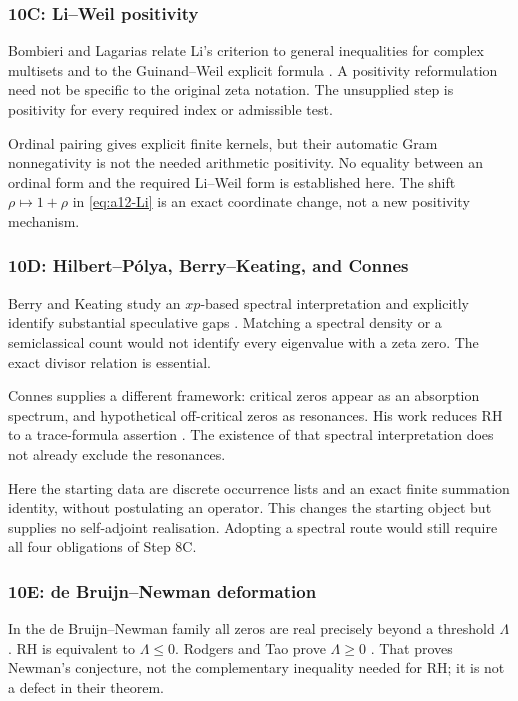 \documentclass[11pt]{amsart}
\numberwithin{equation}{section}
\theoremstyle{plain}
\theoremstyle{definition}
\theoremstyle{remark}
\begin{document}
\subsubsection{10C: Li--Weil positivity}
\label{subsubsec:a12-lit-Li}
Bombieri and Lagarias relate Li's criterion to general inequalities for
complex multisets and to the Guinand--Weil explicit formula
\cite{BombieriLagarias1999}. A positivity reformulation need not be
specific to the original zeta notation. The unsupplied step is positivity
for every required index or admissible test.

Ordinal pairing gives explicit finite kernels, but their automatic Gram
nonnegativity is not the needed arithmetic positivity. No equality between
an ordinal form and the required Li--Weil form is established here.
The shift $\rho\mapsto1+\rho$ in \eqref{eq:a12-Li} is an exact coordinate
change, not a new positivity mechanism.

\subsubsection{10D: Hilbert--P\'olya, Berry--Keating, and Connes}
\label{subsubsec:a12-lit-spectral}
Berry and Keating study an $xp$-based spectral interpretation and
explicitly identify substantial speculative gaps \cite{BerryKeating1999}.
Matching a spectral density or a semiclassical count would not identify
every eigenvalue with a zeta zero. The exact divisor relation is essential.

Connes supplies a different framework: critical zeros appear as an
absorption spectrum, and hypothetical off-critical zeros as resonances.
His work reduces RH to a trace-formula assertion \cite{Connes1998}.
The existence of that spectral interpretation does not already exclude
the resonances.

Here the starting data are discrete occurrence lists and an exact finite
summation identity, without postulating an operator. This changes the
starting object but supplies no self-adjoint realisation. Adopting a
spectral route would still require all four obligations of Step 8C.

\subsubsection{10E: de Bruijn--Newman deformation}
\label{subsubsec:a12-lit-Newman}
In the de Bruijn--Newman family all zeros are real precisely beyond a
threshold $\Lambda$. RH is equivalent to $\Lambda\le0$.
Rodgers and Tao prove $\Lambda\ge0$ \cite{RodgersTao2018}.
That proves Newman's conjecture, not the complementary inequality needed
for RH; it is not a defect in their theorem.
\end{document}
